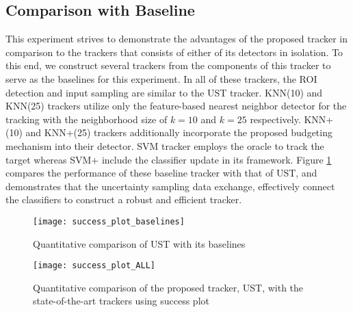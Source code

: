 \documentclass[conference,twoside]{IEEEtran}
\begin{document}
\subsection{Comparison with Baseline}
This experiment strives to demonstrate the advantages of the proposed tracker in comparison to the trackers that consists of either of its detectors in isolation. To this end, we construct several trackers from the components of this tracker to serve as the baselines for this experiment. In all of these trackers, the ROI detection and input sampling are similar to the UST tracker. KNN(10) and KNN(25) trackers utilize only the feature-based nearest neighbor detector for the tracking with the neighborhood size of $k=10$ and $k=25$ respectively. KNN+(10) and KNN+(25) trackers additionally incorporate the proposed budgeting mechanism into their detector. SVM tracker employs the oracle to track the target whereas SVM+ include the classifier update in its framework.
%
Figure \ref{fig:cmp_base_suc} compares the performance of these baseline tracker with that of UST, and demonstrates that the uncertainty sampling data exchange, effectively connect the classifiers to construct a robust and efficient tracker.
\begin{figure}
\centering
\texttt{[image: success\_plot\_baselines]}
\caption{Quantitative comparison of UST with its baselines}
\label{fig:cmp_base_suc}
\vspace{-0.7 cm}
\end{figure}

\begin{figure}[!t]
\centering
\texttt{[image: success\_plot\_ALL]}
\caption{Quantitative comparison of the proposed tracker, UST, with the state-of-the-art trackers using success plot} %
\label{fig:eval_succ_challenges}
\vspace{-0.7 cm}
\end{figure}
\end{document}
